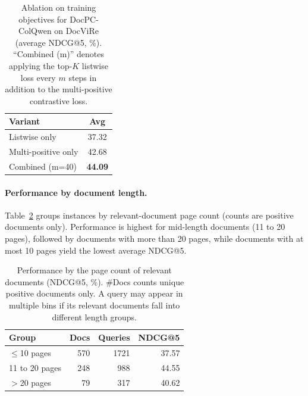 \begin{table}[H]
  \centering
  \small
  \caption{Ablation on training objectives for DocPC-ColQwen on DocViRe (average NDCG@5, \%). ``Combined (m)'' denotes applying the top-$K$ listwise loss every $m$ steps in addition to the multi-positive contrastive loss.}
  \label{tab:loss-ablation}
  \begin{tabular}{@{}lc@{}}
    \toprule
    Variant & Avg \\
    \midrule
    Listwise only & 37.32 \\
    Multi-positive only & 42.68 \\
    Combined (m=40) & \textbf{44.09} \\
    \bottomrule
  \end{tabular}
\end{table}

\paragraph{Performance by document length.}

Table~\ref{tab:length-analysis} groups instances by relevant-document page count (counts are positive documents only). Performance is highest for mid-length documents (11 to 20 pages), followed by documents with more than 20 pages, while documents with at most 10 pages yield the lowest average NDCG@5.

\begin{table}[H]
  \centering
  \small
  \caption{Performance by the page count of relevant documents (NDCG@5, \%). \#Docs counts unique positive documents only. A query may appear in multiple bins if its relevant documents fall into different length groups.}
  \label{tab:length-analysis}
  \begin{tabular}{@{}lrrr@{}}
    \toprule
    Group & Docs & Queries & NDCG@5 \\
    \midrule
    $\leq$10 pages  & 570 & 1721 & 37.57 \\
    11 to 20 pages  & 248 & 988 & 44.55 \\
    $>$20 pages     & 79 & 317 & 40.62 \\
    \bottomrule
  \end{tabular}
\end{table}
